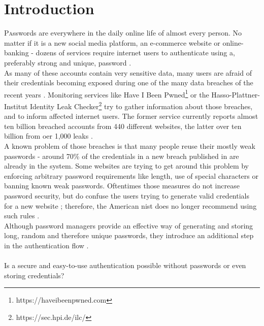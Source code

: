 
\section{Introduction}
\label{sec:intro}

\lettrine[nindent=0em,lines=3]{P}asswords are everywhere in the daily online life of almost every person. No matter if it is a new social media platform, an e-commerce website or online-banking - dozens of services require internet users to authenticate using a, preferably strong and unique, password \cite{nist}.\\
As many of these accounts contain very sensitive data, many users are afraid of their credentials becoming exposed during one of the many data breaches of the recent years \cite{statista_dossier2018}. Monitoring services like Have I Been Pwned\footnote{https://haveibeenpwned.com} or the Hasso-Plattner-Institut Identity Leak Checker\footnote{https://sec.hpi.de/ilc/} try to gather information about those breaches, and to inform affected internet users. The former service currently reports almost ten billion breached accounts from 440 different websites, the latter over ten billion from oer 1,000 leaks \cite{hibp,hpi}.\\
A known problem of those breaches is that many people reuse their mostly weak passwords \cite{bailey2014} - around 70\% of the credentials in a new breach published in\cite{hibp} are already in the system. Some websites are trying to get around this problem by enforcing arbitrary password requirements like length, use of special characters or banning known weak passwords. Oftentimes those measures do not increase password security, but do confuse the users trying to generate valid credentials for a new website \cite{hunt2017}; therefore, the American \ac{nist} does no longer recommend using such rules \cite{nist}.\\
Although password managers provide an effective way of generating and storing long, random and therefore unique passwords, they introduce an additional step in the authentication flow \cite{lyastani2018}.\\
\\
Is a secure and easy-to-use authentication possible without passwords or even storing credentials?\\
